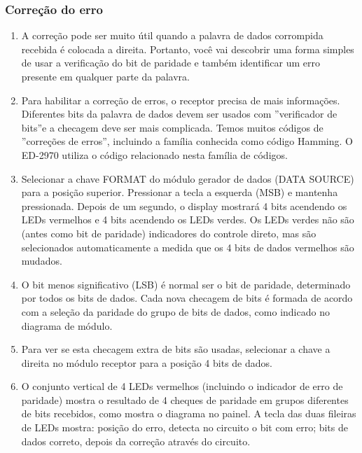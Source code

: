             \subsubsection{Correção do erro}
                \begin{enumerate}
                    \item A correção pode ser muito útil quando a palavra de dados corrompida recebida é colocada
                    a direita. Portanto, você vai descobrir uma forma simples de usar a verificação do bit de
                    paridade e também identificar um erro presente em qualquer parte da palavra.
                    
                    \item Para habilitar a correção de erros, o receptor precisa de mais informações. Diferentes bits
                    da palavra de dados devem ser usados com ”verificador de bits”e a checagem deve ser mais
                    complicada. Temos muitos códigos de ”correções de erros”, incluindo a família conhecida
                    como código Hamming. O ED-2970 utiliza o código relacionado nesta família de códigos.
                    
                    \item Selecionar a chave FORMAT do módulo gerador de dados (DATA SOURCE) para a posição
                    superior. Pressionar a tecla a esquerda (MSB) e mantenha pressionada. Depois de um
                    segundo, o display mostrará 4 bits acendendo os LEDs vermelhos e 4 bits acendendo os
                    LEDs verdes. Os LEDs verdes não são (antes como bit de paridade) indicadores do controle
                    direto, mas são selecionados automaticamente a medida que os 4 bits de dados vermelhos
                    são mudados.
                    
                    \item O bit menos significativo (LSB) é normal ser o bit de paridade, determinado por todos os
                    bits de dados. Cada nova checagem de bits é formada de acordo com a seleção da paridade
                    do grupo de bits de dados, como indicado no diagrama de módulo.
                    
                    \item Para ver se esta checagem extra de bits são usadas, selecionar a chave a direita no módulo
                    receptor para a posição 4 bits de dados.
                    
                    \item O conjunto vertical de 4 LEDs vermelhos (incluindo o indicador de erro de paridade) mostra
                    o resultado de 4 cheques de paridade em grupos diferentes de bits recebidos, como mostra o
                    diagrama no painel. A tecla das duas fileiras de LEDs mostra: posição do erro, detecta no
                    circuito o bit com erro; bits de dados correto, depois da correção através do circuito.
                    

\end{enumerate}
